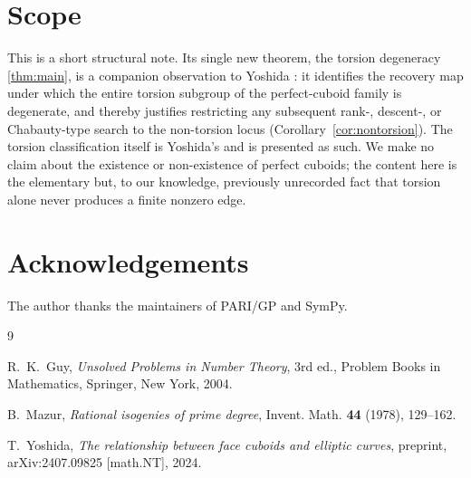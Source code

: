 \documentclass[11pt,reqno]{amsart}
\theoremstyle{plain}
\theoremstyle{definition}
\begin{document}
\section{Scope}

This is a short structural note. Its single new theorem, the torsion degeneracy
\ref{thm:main}, is a companion observation to Yoshida \cite{Yoshida}: it identifies the
recovery map under which the entire torsion subgroup of the perfect-cuboid family is
degenerate, and thereby justifies restricting any subsequent rank-, descent-, or
Chabauty-type search to the non-torsion locus (Corollary~\ref{cor:nontorsion}). The
torsion classification itself is Yoshida's and is presented as such. We make no claim
about the existence or non-existence of perfect cuboids; the content here is the
elementary but, to our knowledge, previously unrecorded fact that torsion alone never
produces a finite nonzero edge.

\section*{Acknowledgements}
The author thanks the maintainers of PARI/GP and SymPy.

\begin{thebibliography}{9}

 R.~K.~Guy, \emph{Unsolved Problems in Number Theory}, 3rd ed.,
Problem Books in Mathematics, Springer, New York, 2004.

 B.~Mazur, \emph{Rational isogenies of prime degree}, Invent. Math.
\textbf{44} (1978), 129--162.

 T.~Yoshida, \emph{The relationship between face cuboids and elliptic
curves}, preprint, arXiv:2407.09825 [math.NT], 2024.

\end{thebibliography}
\end{document}
